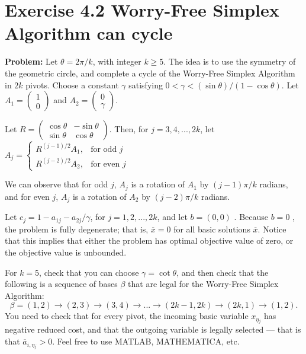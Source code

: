 
\section{Exercise 4.2 Worry-Free Simplex Algorithm can cycle}
\textbf{Problem:} Let $\theta=2\pi/k$, with integer $k\geq5$. The idea is to use the symmetry of the geometric circle, and complete a cycle of the Worry-Free Simplex Algorithm in $2k$ pivots. Choose a constant $\gamma$ satisfying $0<\gamma<(\sin \theta)/(1-\cos \theta)$. Let $A_1=\left( \begin{array}{c} 1\\ 0\end{array}\right)$ and $A_2=\left( \begin{array}{c} 0\\ \gamma\end{array}\right)$.

Let $R=\left( \begin{array}{cc} \cos \theta & -\sin \theta\\ \sin \theta & \cos \theta \end{array}\right)$. Then, for $j=3,4,...,2k$, let $A_j=\left\lbrace \begin{array}{cc} R^{(j-1)/2}A_1, & \text{for odd } j\\ R^{(j-2)/2}A_2, &  \text{for even } j\end{array}\right.$

We can observe that for odd $j$, $A_j$ is a rotation of $A_1$ by $(j-1)\pi/k$ radians, and for even $j$, $A_j$ is a rotation of $A_2$ by $(j-2)\pi/k$ radians.

Let $c_j=1-a_{1j}-a_{2j}/\gamma$, for $j=1,2,...,2k$, and let $b=(0, 0)$ . Because $b=0$ , the problem is fully degenerate; that is, $\overline{x}=0$ for all basic solutions $\overline{x}$. Notice that this implies that either the problem has optimal objective value of zero, or the objective value is unbounded.

For $k=5$, check that you can choose $\gamma=\cot \theta$, and then check that the following is a sequence of bases $\beta$ that are legal for the Worry-Free Simplex Algorithm:
\[
\beta = (1,2) \rightarrow (2, 3) \rightarrow (3, 4) \rightarrow ... \rightarrow (2k-1, 2k) \rightarrow (2k, 1) \rightarrow (1, 2).
\]
You need to check that for every pivot, the incoming basic variable $x_{\eta{}_j}$ has negative reduced cost, and that the outgoing variable is legally selected — that is that $\overline{a}_{i,\eta{}_j}>0$. Feel free to use MATLAB, MATHEMATICA, etc.



